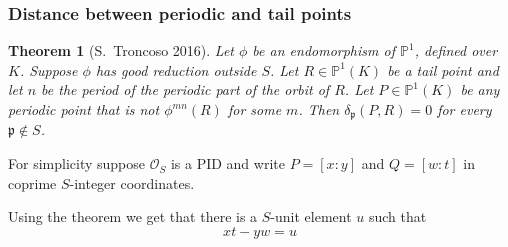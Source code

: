 \documentclass{beamer}
\def\jump{ \quad \\ \vspace{0.7cm} \pause}
\def\PP{{\mathbb P}}
\def\pp{{\mathfrak p}}
\DeclareMathOperator{\Tail}{Tail}
\DeclareMathOperator{\Per}{Per}
\theoremstyle{thmstyle}
\theoremstyle{thmstyle}
\newtheorem*{mythm}{Theorem}
\theoremstyle{mystyle}
\theoremstyle{qstnstyle}
\begin{document}
\begin{frame}
\frametitle{Distance between periodic and tail points}
\begin{mythm}[S.\ Troncoso 2016]
Let $\phi$ be an endomorphism of $\PP^1$, defined over $K$. Suppose $\phi$ has good reduction outside $S$. Let $R\in\PP^1(K)$ be a tail point and let $n$ be the period of the periodic part of the orbit of $R$. Let $P\in\PP^1(K)$ be any periodic point that is not $\phi^{mn}(R)$ for some $m$. Then $\delta_\pp(P,R)=0$ for every $\pp \notin S$.
\end{mythm}

For simplicity suppose $\mathcal{O}_S$ is a PID and write $P=[x:y]$ and $Q=[w:t]$ in coprime $S$-integer coordinates.

\pause Using the theorem we get that there is a $S$-unit element $u$ such that
$$xt-yw=u $$

 
\end{frame}

%
%
%
%
%
%
%
%
%
%
%
%
%
\end{document}
